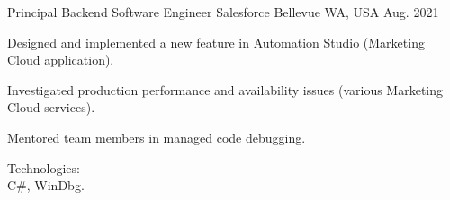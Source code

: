 
\begin{cventries}

\cventry
{Principal Backend Software Engineer} %
{Salesforce} %
{Bellevue WA, USA} %
{Aug. 2021 } %
{
  \begin{cvitems} %
    \item
    {
      Designed and implemented a new feature in Automation Studio (Marketing Cloud application).
    }
    \item
    {
      Investigated production performance and availability issues (various Marketing Cloud services).
    }
    \item
    {
      Mentored team members in managed code debugging.
    }
    \item
    {
      Technologies:\\
      {C\#}, WinDbg.
    }
  \end{cvitems}
}



\end{cventries}
